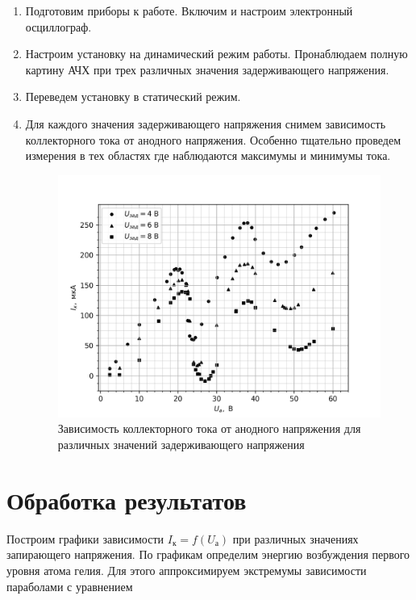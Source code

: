 \documentclass[14pt, a4paper]{report}
\begin{document}
\begin{enumerate}

\item Подготовим приборы к работе. Включим и настроим электронный осциллограф.

\item Настроим установку на динамический режим работы. Пронаблюдаем полную картину АЧХ при трех различных значения задерживающего напряжения.

\item Переведем установку в статический режим.

\item Для каждого значения задерживающего напряжения снимем зависимость коллекторного тока от анодного напряжения. Особенно тщательно проведем измерения в тех областях где наблюдаются максимумы и минимумы тока.

\begin{figure}[H]
\centering
\includegraphics[scale=1]{../images/521-4}
\caption{Зависимость коллекторного тока от анодного напряжения для различных значений задерживающего напряжения}
\end{figure}

\end{enumerate}

\section{Обработка результатов}

Построим графики зависимости $I_к=f(U_а)$ при различных значениях запирающего напряжения. По графикам определим энергию возбуждения первого уровня атома гелия. Для этого аппроксимируем экстремумы зависимости параболами с уравнением
\end{document}
